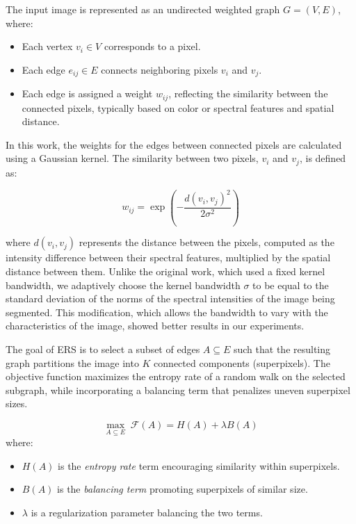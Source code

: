 \documentclass[twoside,english]{article}
\begin{document}
The input image is represented as an undirected weighted graph \( G = (V, E) \), where:
\begin{itemize}
	\item Each vertex \( v_i \in V \) corresponds to a pixel.
	\item Each edge \( e_{ij} \in E \) connects neighboring pixels \( v_i \) and \( v_j \).
	\item Each edge is assigned a weight \( w_{ij} \), reflecting the similarity between the connected pixels, typically based on color or spectral features and spatial distance.
\end{itemize}

In this work, the weights for the edges between connected pixels are calculated using a Gaussian kernel. The similarity between two pixels, \(v_i\) and \(v_j\), is defined as:

\[
w_{ij} = \exp\left(- \frac{d(v_i, v_j)^2}{2\sigma^2}\right)
\]

where \(d(v_i, v_j)\) represents the distance between the pixels, computed as the intensity difference between their spectral features, multiplied by the spatial distance between them. Unlike the original work, which used a fixed kernel bandwidth, we adaptively choose the kernel bandwidth \(\sigma\) to be equal to the standard deviation of the norms of the spectral intensities of the image being segmented. This modification, which allows the bandwidth to vary with the characteristics of the image, showed better results in our experiments.

The goal of ERS is to select a subset of edges \( A \subseteq E \) such that the resulting graph partitions the image into \( K \) connected components (superpixels). The objective function maximizes the entropy rate of a random walk on the selected subgraph, while incorporating a balancing term that penalizes uneven superpixel sizes.

\begin{equation}
	\max_{A \subseteq E} \; \mathcal{F}(A) = H(A) + \lambda B(A)	
\end{equation}
where:
\begin{itemize}
	\item \( H(A) \) is the \textit{entropy rate} term encouraging similarity within superpixels.
	\item \( B(A) \) is the \textit{balancing term} promoting superpixels of similar size.
	\item \( \lambda \) is a regularization parameter balancing the two terms.
\end{itemize}
\end{document}
